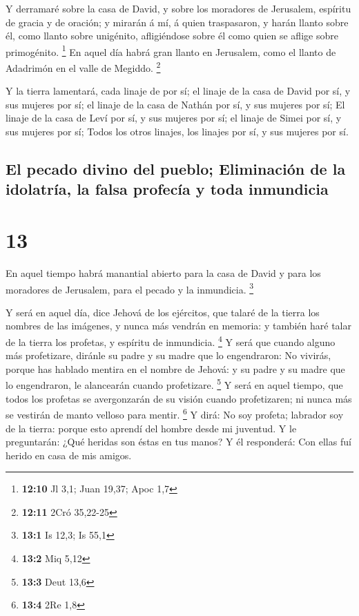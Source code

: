  Y derramaré sobre la casa de David, y sobre los moradores
de Jerusalem, espíritu de gracia y de oración; y mirarán á mí, á quien
traspasaron, y harán llanto sobre él, como llanto sobre unigénito,
afligiéndose sobre él como quien se aflige sobre primogénito.
\footnote{\textbf{12:10} Jl 3,1; Juan 19,37; Apoc 1,7}  En
aquel día habrá gran llanto en Jerusalem, como el llanto de Adadrimón en
el valle de Megiddo. \footnote{\textbf{12:11} 2Cró 35,22-25}

 Y la tierra lamentará, cada linaje de por sí; el linaje de
la casa de David por sí, y sus mujeres por sí; el linaje de la casa de
Nathán por sí, y sus mujeres por sí;  El linaje de la casa
de Leví por sí, y sus mujeres por sí; el linaje de Simei por sí, y sus
mujeres por sí;  Todos los otros linajes, los linajes por
sí, y sus mujeres por sí.

\hypertarget{el-pecado-divino-del-pueblo-eliminaciuxf3n-de-la-idolatruxeda-la-falsa-profecuxeda-y-toda-inmundicia}{%
\subsection{El pecado divino del pueblo; Eliminación de la idolatría, la
falsa profecía y toda
inmundicia}\label{el-pecado-divino-del-pueblo-eliminaciuxf3n-de-la-idolatruxeda-la-falsa-profecuxeda-y-toda-inmundicia}}

\hypertarget{section-12}{%
\section{13}\label{section-12}}

 En aquel tiempo habrá manantial abierto para la casa de
David y para los moradores de Jerusalem, para el pecado y la inmundicia.
\footnote{\textbf{13:1} Is 12,3; Is 55,1}

 Y será en aquel día, dice Jehová de los ejércitos, que
talaré de la tierra los nombres de las imágenes, y nunca más vendrán en
memoria: y también haré talar de la tierra los profetas, y espíritu de
inmundicia. \footnote{\textbf{13:2} Miq 5,12}  Y será que
cuando alguno más profetizare, diránle su padre y su madre que lo
engendraron: No vivirás, porque has hablado mentira en el nombre de
Jehová: y su padre y su madre que lo engendraron, le alancearán cuando
profetizare. \footnote{\textbf{13:3} Deut 13,6}  Y será en
aquel tiempo, que todos los profetas se avergonzarán de su visión cuando
profetizaren; ni nunca más se vestirán de manto velloso para mentir.
\footnote{\textbf{13:4} 2Re 1,8}  Y dirá: No soy profeta;
labrador soy de la tierra: porque esto aprendí del hombre desde mi
juventud.  Y le preguntarán: ¿Qué heridas son éstas en tus
manos? Y él responderá: Con ellas fuí herido en casa de mis amigos.

